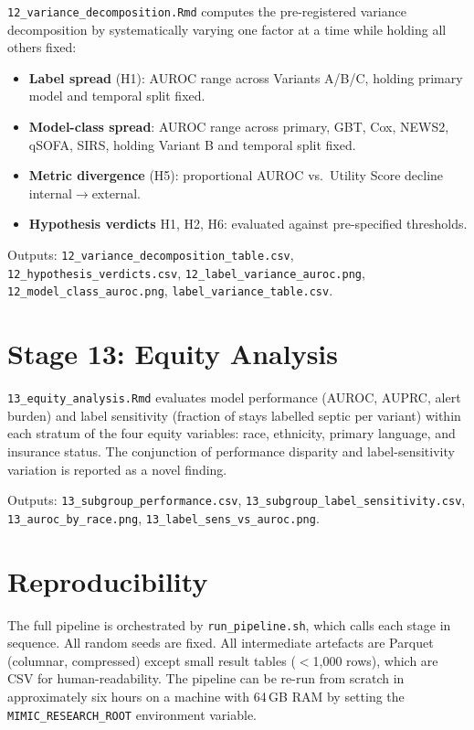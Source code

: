 \texttt{12\_variance\_decomposition.Rmd} computes the pre-registered variance
decomposition by systematically varying one factor at a time while holding all
others fixed:

\begin{itemize}
  \item \textbf{Label spread} (H1): AUROC range across Variants A/B/C, holding
  primary model and temporal split fixed.
  \item \textbf{Model-class spread}: AUROC range across primary, GBT, Cox, NEWS2,
  qSOFA, SIRS, holding Variant B and temporal split fixed.
  \item \textbf{Metric divergence} (H5): proportional AUROC vs.\ Utility Score
  decline internal$\to$external.
  \item \textbf{Hypothesis verdicts} H1, H2, H6: evaluated against pre-specified
  thresholds.
\end{itemize}

Outputs: \texttt{12\_variance\_decomposition\_table.csv},
\texttt{12\_hypothesis\_verdicts.csv}, \texttt{12\_label\_variance\_auroc.png},
\texttt{12\_model\_class\_auroc.png}, \texttt{label\_variance\_table.csv}.

\section{Stage 13: Equity Analysis}

\texttt{13\_equity\_analysis.Rmd} evaluates model performance (AUROC, AUPRC, alert
burden) and label sensitivity (fraction of stays labelled septic per variant)
within each stratum of the four equity variables: race, ethnicity, primary
language, and insurance status. The conjunction of performance disparity and
label-sensitivity variation is reported as a novel finding.

Outputs: \texttt{13\_subgroup\_performance.csv},
\texttt{13\_subgroup\_label\_sensitivity.csv}, \texttt{13\_auroc\_by\_race.png},
\texttt{13\_label\_sens\_vs\_auroc.png}.

\section{Reproducibility}

The full pipeline is orchestrated by \texttt{run\_pipeline.sh}, which calls each
stage in sequence. All random seeds are fixed. All intermediate artefacts are
Parquet (columnar, compressed) except small result tables ($<$1{,}000 rows),
which are CSV for human-readability. The pipeline can be re-run from scratch
in approximately six hours on a machine with 64\,GB RAM by setting the
\texttt{MIMIC\_RESEARCH\_ROOT} environment variable.
